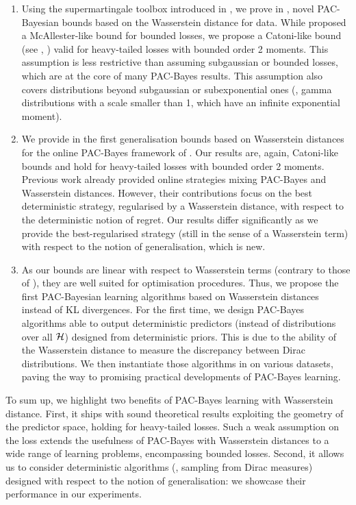 \begin{enumerate}[label={\it (\roman*)}]
    \item Using the supermartingale toolbox introduced in \cite{haddouche2023pac,chugg2023unified}, we prove in , novel PAC-Bayesian bounds based on the Wasserstein distance for \iid data.
    While \cite{amit2022integral} proposed a McAllester-like bound for bounded losses, we propose a Catoni-like bound (see \eg, \citealp[Theorem 4.1]{alquier2016properties}) valid for heavy-tailed losses with bounded order 2 moments.
    This assumption is less restrictive than assuming subgaussian or bounded losses, which are at the core of many PAC-Bayes results.
    This assumption also covers distributions beyond subgaussian or subexponential ones (\eg, gamma distributions with a scale smaller than 1, which have an infinite exponential moment). 
    \item We provide in  the first generalisation bounds based on Wasserstein distances for the online PAC-Bayes framework of \cite{haddouche2022online}.
    Our results are, again, Catoni-like bounds and hold for heavy-tailed losses with bounded order 2 moments.
    Previous work \citep{chee2021learning} already provided online strategies mixing PAC-Bayes and Wasserstein distances.
    However, their contributions focus on the best deterministic strategy, regularised by a Wasserstein distance, with respect to the deterministic notion of regret.
    Our results differ significantly as we provide the best-regularised strategy (still in the sense of a Wasserstein term) with respect to the notion of generalisation, which is new.
    \item As our bounds are linear with respect to Wasserstein terms (contrary to those of \citealp{amit2022integral}), they are well suited for optimisation procedures.
    Thus, we propose the first PAC-Bayesian learning algorithms based on Wasserstein distances instead of KL divergences.
    For the first time, we design PAC-Bayes algorithms able to output deterministic predictors (instead of distributions over all $\mathcal{H}$) designed from deterministic priors.
    This is due to the ability of the Wasserstein distance to measure the discrepancy between Dirac distributions.     
    We then instantiate those algorithms in  on various datasets, paving the way to promising practical developments of PAC-Bayes learning. 
\end{enumerate}

To sum up, we highlight two benefits of PAC-Bayes learning with Wasserstein distance.
First, it ships with sound theoretical results exploiting the geometry of the predictor space, holding for heavy-tailed losses.
Such a weak assumption on the loss extends the usefulness of PAC-Bayes with Wasserstein distances to a wide range of learning problems, encompassing bounded losses.
Second, it allows us to consider deterministic algorithms (\ie, sampling from Dirac measures) designed with respect to the notion of generalisation: we showcase their performance in our experiments.

